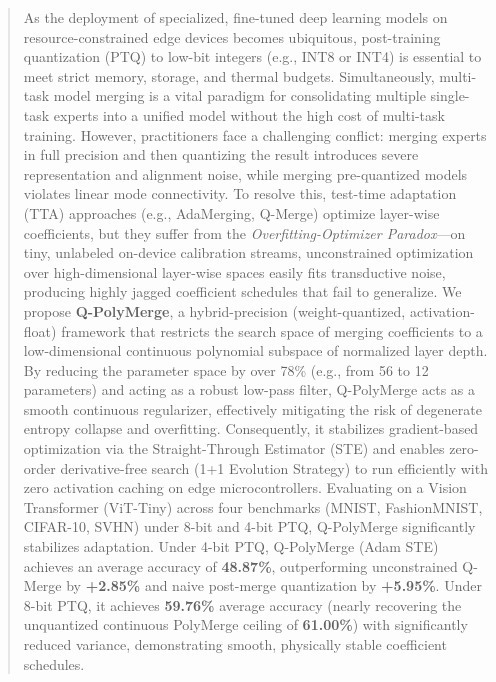 \begin{abstract}
As the deployment of specialized, fine-tuned deep learning models on resource-constrained edge devices becomes ubiquitous, post-training quantization (PTQ) to low-bit integers (e.g., INT8 or INT4) is essential to meet strict memory, storage, and thermal budgets.
Simultaneously, multi-task model merging is a vital paradigm for consolidating multiple single-task experts into a unified model without the high cost of multi-task training.
However, practitioners face a challenging conflict: merging experts in full precision and then quantizing the result introduces severe representation and alignment noise, while merging pre-quantized models violates linear mode connectivity.
To resolve this, test-time adaptation (TTA) approaches (e.g., AdaMerging, Q-Merge) optimize layer-wise coefficients, but they suffer from the \emph{Overfitting-Optimizer Paradox}---on tiny, unlabeled on-device calibration streams, unconstrained optimization over high-dimensional layer-wise spaces easily fits transductive noise, producing highly jagged coefficient schedules that fail to generalize.
We propose \textbf{Q-PolyMerge}, a hybrid-precision (weight-quantized, activation-float) framework that restricts the search space of merging coefficients to a low-dimensional continuous polynomial subspace of normalized layer depth.
By reducing the parameter space by over 78\% (e.g., from 56 to 12 parameters) and acting as a robust low-pass filter, Q-PolyMerge acts as a smooth continuous regularizer, effectively mitigating the risk of degenerate entropy collapse and overfitting.
Consequently, it stabilizes gradient-based optimization via the Straight-Through Estimator (STE) and enables zero-order derivative-free search (1+1 Evolution Strategy) to run efficiently with zero activation caching on edge microcontrollers.
Evaluating on a Vision Transformer (ViT-Tiny) across four benchmarks (MNIST, FashionMNIST, CIFAR-10, SVHN) under 8-bit and 4-bit PTQ, Q-PolyMerge significantly stabilizes adaptation. Under 4-bit PTQ, Q-PolyMerge (Adam STE) achieves an average accuracy of \textbf{48.87\%}, outperforming unconstrained Q-Merge by \textbf{+2.85\%} and naive post-merge quantization by \textbf{+5.95\%}. Under 8-bit PTQ, it achieves \textbf{59.76\%} average accuracy (nearly recovering the unquantized continuous PolyMerge ceiling of \textbf{61.00\%}) with significantly reduced variance, demonstrating smooth, physically stable coefficient schedules.
\end{abstract}

